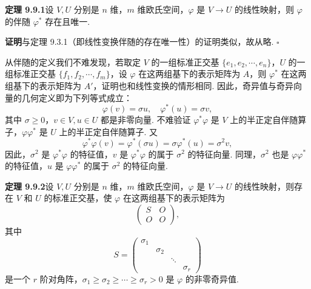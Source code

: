 \documentclass[UTF8, 12pt, fontset=fandol, oneside]{ctexart}
\begin{document}
\noindent\textbf{定理 9.9.1}\quad 设 $V,U$ 分别是 $n$ 维，$m$ 维欧氏空间，$\varphi$ 是 $V\to U$ 的线性映射，则 $\varphi$ 的伴随 $\varphi^*$ 存在且唯一.

\noindent\textbf{证明}\quad 与定理 9.3.1（即线性变换伴随的存在唯一性）的证明类似，故从略. $\square$

从伴随的定义我们不难发现，若取定 $V$ 的一组标准正交基 $\{e_1,e_2,\cdots,e_n\}$，$U$ 的一组标准正交基 $\{f_1,f_2,\cdots,f_m\}$，设 $\varphi$ 在这两组基下的表示矩阵为 $A$，则 $\varphi^*$ 在这两组基下的表示矩阵为 $A'$，证明也和线性变换的情形相同. 因此，奇异值与奇异向量的几何定义即为下列等式成立：
\[
  \varphi(v)=\sigma u,\quad \varphi^*(u)=\sigma v,
\]
其中 $\sigma\ge0$，$v\in V,u\in U$ 都是非零向量. 不难验证 $\varphi^*\varphi$ 是 $V$ 上的半正定自伴随算子，$\varphi\varphi^*$ 是 $U$ 上的半正定自伴随算子. 又
\[
  \varphi^*\varphi(v)=\varphi^*(\sigma u)=\sigma\varphi^*(u)=\sigma^2v,
\]
因此，$\sigma^2$ 是 $\varphi^*\varphi$ 的特征值，$v$ 是 $\varphi^*\varphi$ 的属于 $\sigma^2$ 的特征向量. 同理，$\sigma^2$ 也是 $\varphi\varphi^*$ 的特征值，$u$ 是 $\varphi\varphi^*$ 的属于 $\sigma^2$ 的特征向量.

\noindent\textbf{定理 9.9.2}\quad 设 $V,U$ 分别是 $n$ 维，$m$ 维欧氏空间，$\varphi$ 是 $V\to U$ 的线性映射，则存在 $V$ 和 $U$ 的标准正交基，使 $\varphi$ 在这两组基下的表示矩阵为
\[
  \left(\begin{array}{cc}
    S & O\\
    O & O
  \end{array}\right),
\]
其中
\[
  S=
  \left(\begin{array}{cccc}
    \sigma_1 & & &\\
    & \sigma_2 & &\\
    & & \ddots &\\
    & & & \sigma_r
  \end{array}\right)
\]
是一个 $r$ 阶对角阵，$\sigma_1\ge\sigma_2\ge\cdots\ge\sigma_r>0$ 是 $\varphi$ 的非零奇异值.
\end{document}
